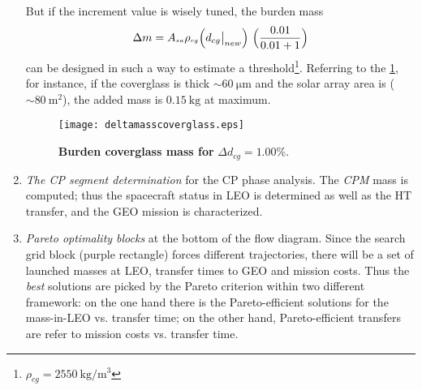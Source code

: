 \begin{enumerate}
But if the increment value is wisely tuned, the burden mass
\begin{equation}
\Delta m = A{\scriptstyle_{sa}}\rho{\scriptstyle{_{cg}}}\Bigl(d_{cg}\big|_{new}\Bigr)~\Bigl(\dfrac{0.01}{0.01+1}\Bigr) \label{eq:burdenmasscoverglass}
\end{equation}
can be designed in such a way to estimate a threshold\footnote{$\rho_{cg} = 2550 ~\si{\kg\per\cubic\meter}$}.
Referring to the \figurename\ref{fig:burdencoverglassmass}, for instance, if the coverglass is thick $\sim 60~\si{\micro\meter}$ and the solar array area is ($\sim80~\si{\square\meter}$), the added mass is  $0.15~\si{\kilo\gram}$ at maximum.
%
\begin{figure}[htp]
\centering
\texttt{[image: deltamasscoverglass.eps]}
\caption[Burden coverglass mass]{\textbf{Burden coverglass mass for} $\Delta d_{\scriptstyle{cg}} = 1.00\%$.}
\label{fig:burdencoverglassmass}
\end{figure}
\item \emph{The CP segment determination} for the CP phase analysis. The \textit{CPM} mass is computed; thus the spacecraft status in LEO is determined as well as the HT transfer, and the GEO mission is characterized.
\item \emph{Pareto optimality blocks} at the bottom of the flow diagram. Since the search grid block (purple rectangle) forces different trajectories, there will be a set of launched masses at LEO, transfer times to GEO and mission costs. 
Thus the \emph{best} solutions are picked by the Pareto criterion within two different framework: on the one hand there is the Pareto-efficient solutions for the mass-in-LEO vs. transfer time; on the other hand, Pareto-efficient transfers are refer to mission costs vs. transfer time.
\end{enumerate}